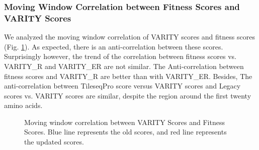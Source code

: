 \documentclass{article}
\begin{document}


\subsubsection{Moving Window Correlation between Fitness Scores and VARITY Scores}
We analyzed the moving window correlation of VARITY scores and fitness scores (Fig. \ref{fig:VARITY_CALM1}). As expected, there is an anti-correlation between these scores. Surprisingly however, the trend of the correlation between fitness scores vs. VARITY\_R and VARITY\_ER are not similar. The Anti-correlation between fitness scores and VARITY\_R are better than with VARITY\_ER. Besides, The anti-correlation between TileseqPro score versus VARITY scores and Legacy scores vs. VARITY scores are similar, despite the region around the first twenty amino acids.


\begin{figure}[H]%
    \centering
    \qquad
    \caption{Moving window correlation between VARITY Scores and Fitness Scores. Blue line represents the old scores, and red line represents the updated scores.}%
    \label{fig:VARITY_CALM1}%
\end{figure}
\end{document}
